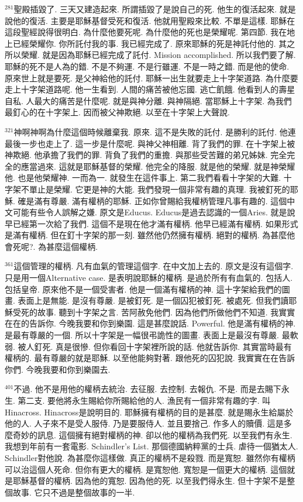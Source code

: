 \documentclass{book}
\begin{document}
$^{281}$聖殿插毀了.
三天又建造起來.
所謂插毀了是說自己的死.
他生的復活起來.
就是說他的復活.
主要是耶穌基督受死和復活.
他就用聖殿來比較.
不單是這樣.
耶穌在這段聖經說得很明白.
為什麼他要死呢.
為什麼他的死也是榮耀呢.
第四節.
我在地上已經榮耀你.
你所託付我的事.
我已經完成了.
原來耶穌的死是神託付他的.
其之所以榮耀.
就是因為耶穌已經完成了託付.
Mission accomplished.
所以我們要了解.
耶穌的死不是人為的錯.
不是不夠運.
不是行雖運.
不是一時之錯.
而是他的使命.
原來世上就是要死.
是父神給他的託付.
耶穌一出生就要走上十字架道路.
為什麼要走上十字架道路呢.
他一生看到.
人間的痛苦被他忘國.
逃亡飢餓.
他看到人的壽星自私.
人最大的痛苦是什麼呢.
就是與神分離.
與神隔絕.
當耶穌上十字架.
為我們最釘心的在十字架上.
因而被父神欺絕.
以至在十字架上大聲說.

$^{321}$神啊神啊為什麼這個時候離棄我.
原來.
這不是失敗的託付.
是勝利的託付.
他連最後一步也走上了.
這一步是什麼呢.
與神父神相離.
背了我們的罪.
在十字架上被神欺絕.
他承擔了我們的罪.
背負了我們的重擔.
與那些受苦難的弟兄姊妹.
完全完全的應當過來.
這就是耶穌基督的榮耀.
他完全的降服.
就是他的榮耀.
就是神榮耀他.
也是他榮耀神.
一而為一.
就發生在這件事上.
第二我們看看十字架的大難.
十字架不單止是榮耀.
它更是神的大能.
我們發現一個非常有趣的真理.
我被釘死的耶穌.
確是滿有尊嚴.
滿有權柄的耶穌.
正如你曾賜給我權柄管理凡事有趣的.
這個中文可能有些令人誤解之嫌.
原文是Educus.
Educus是過去認識的一個Aries.
就是說早已經第一次給了我們.
這個不是現在他才滿有權柄.
他早已經滿有權柄.
如果形式是滿有權柄.
但在釘十字架的那一刻.
雖然他仍然擁有權柄.
絕對的權柄.
為甚麼他會死呢?.
為甚麼這個權柄.

$^{361}$這個管理的權柄.
凡有血氣的管理這個字.
在中文加上去的.
原文是沒有這個字.
只是用一個Alternative case.
是表明說耶穌的權柄.
是過於所有有血氣的.
包括人.
包括皇帝.
原來他不是一個受害者.
他是一個滿有權柄的神.
這十字架給我們的圖畫.
表面上是無能.
是沒有尊嚴.
是被釘死.
是一個囚犯被釘死.
被處死.
但我們讀耶穌受死的故事.
聽到十字架之言.
苦阿赦免他們.
因為他們所做他們不知道.
我實實在在的告訴你.
今晚我要和你到樂園.
這是甚麼說話.
Powerful.
他是滿有權柄的神.
是最有尊嚴的一個.
所以十字架是一幅很弔詭性的圖畫.
表面上是最沒有尊嚴.
最軟弱.
被人釘死.
真是很慘.
但你看回十字架裡所說的話.
他就告訴你.
其實當時最有權柄的.
最有尊嚴的就是耶穌.
以至他能夠對著.
跟他死的囚犯說.
我實實在在告訴你們.
今晚我要和你到樂園去.

$^{401}$不過.
他不是用他的權柄去統治.
去征服.
去控制.
去報仇.
不是.
而是去賜下永生.
第二支.
要他將永生賜給你所賜給他的人.
漁民有一個非常有趣的字.
叫Hinacross.
Hinacross是說明目的.
耶穌擁有權柄的目的是甚麼.
就是賜永生給屬於他的人.
人子來不是受人服侍.
乃是要服侍人.
並且要捨己.
作多人的贖價.
這是多麼奇妙的訊息.
這個擁有絕對權柄的神.
卻以他的權柄為我們死.
以至我們有永生.
我想到年前有一套電影.
Schindler's List.
那個德國納粹黨的士兵.
虐待一個猶太人.
Schindler對他說.
為甚麼你這樣做.
真正的權柄不是殺戮.
而是寬恕.
雖然你有權柄可以治這個人死命.
但你有更大的權柄.
是寬恕他.
寬恕是一個更大的權柄.
這個就是耶穌基督的權柄.
因為他的寬恕.
因為他的死.
以至我們得永生.
但十字架不是整個故事.
它只不過是整個故事的一半.
\end{document}

